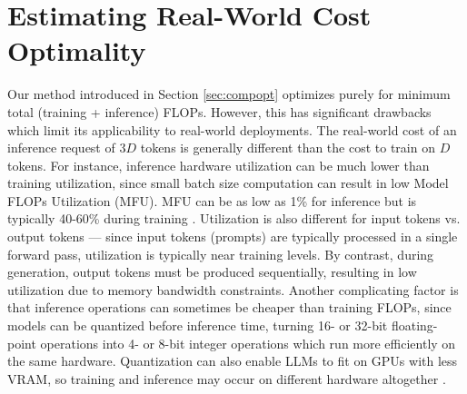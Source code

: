 \documentclass{article}
\theoremstyle{plain}
\theoremstyle{definition}
\theoremstyle{remark}
\renewcommand{\textapprox}{\raisebox{0.5ex}{\texttildelow}}
\begin{document}
\section{Estimating Real-World Cost Optimality}
\label{sec:costopt}
Our method introduced in Section \ref{sec:compopt} optimizes purely for minimum total (training + inference) FLOPs. However, this has significant drawbacks which limit its applicability to real-world deployments. The real-world cost of an inference request of $3D$ tokens is generally different than the cost to train on $D$ tokens. For instance, inference hardware utilization can be much lower than training utilization, since small batch size computation can result in low Model FLOPs Utilization (MFU). MFU can be as low as \textapprox1\% for inference \citep{palminference} but is typically 40-60\% during training \citep{megatronlm}. Utilization is also different for input tokens vs. output tokens --- since input tokens (prompts) are typically processed in a single forward pass, utilization is typically near training levels. By contrast, during generation, output tokens must be produced sequentially, resulting in low utilization due to memory bandwidth constraints. Another complicating factor is that inference operations can sometimes be cheaper than training FLOPs, since models can be quantized before inference time, turning 16- or 32-bit floating-point operations into 4- or 8-bit integer operations which run more efficiently on the same hardware. Quantization can also enable LLMs to fit on GPUs with less VRAM, so training and inference may occur on different hardware altogether \citep{gptq}. 
\end{document}
